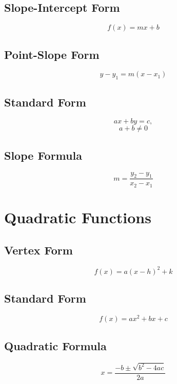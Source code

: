\documentclass{book}
\begin{document}
\subsection{Slope-Intercept Form}
\begin{equation} 
    f(x) = mx + b
\end{equation}

\subsection{Point-Slope Form}
\begin{equation}
    y-y_1 = m(x - x_1)
\end{equation}
\subsection{Standard Form}
\begin{equation}
    ax+by = c,
\end{equation}
\begin{equation}
    a+b \neq 0 
\end{equation}
\subsection{Slope Formula}
\begin{equation}
    m = \frac{y_2 - y_1}{x_2 - x_1}
\end{equation}

\section{Quadratic Functions}
\subsection{Vertex Form}
\begin{equation}
    f(x) = a(x-h)^2 + k
\end{equation}

\subsection{Standard Form}
\begin{equation}
    f(x) = ax^2 + bx + c
\end{equation}

\subsection{Quadratic Formula}
\begin{equation}
	x = \frac{-b \pm \sqrt{b^2 - 4ac}}{2a}
\end{equation}
\end{document}
